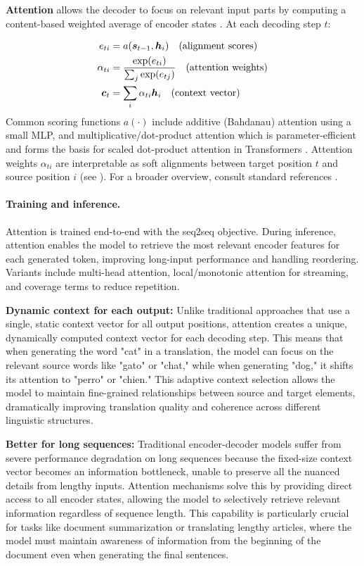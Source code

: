 \textbf{Attention} allows the decoder to focus on relevant input parts by computing a content-based weighted average of encoder states \cite{Bahdanau2014}. At each decoding step $t$:

\begin{align}
e_{ti} &= a(\boldsymbol{s}_{t-1}, \boldsymbol{h}_i) \quad \text{(alignment scores)} \\
\alpha_{ti} &= \frac{\exp(e_{ti})}{\sum_j \exp(e_{tj})} \quad \text{(attention weights)} \\
\boldsymbol{c}_t &= \sum_i \alpha_{ti} \boldsymbol{h}_i \quad \text{(context vector)}
\end{align}
Common scoring functions $a(\cdot)$ include additive (Bahdanau) attention using a small MLP, and multiplicative/dot-product attention which is parameter-efficient and forms the basis for scaled dot-product attention in Transformers \cite{Vaswani2017}. Attention weights $\alpha_{ti}$ are interpretable as soft alignments between target position $t$ and source position $i$ (see \cite{WebAttentionWikipedia}). For a broader overview, consult standard references \cite{WebDLBRNN,D2LChapterAttention}.

\paragraph{Training and inference.} Attention is trained end-to-end with the seq2seq objective. During inference, attention enables the model to retrieve the most relevant encoder features for each generated token, improving long-input performance and handling reordering. Variants include multi-head attention, local/monotonic attention for streaming, and coverage terms to reduce repetition.


\textbf{Dynamic context for each output:} Unlike traditional approaches that use a single, static context vector for all output positions, attention creates a unique, dynamically computed context vector for each decoding step. This means that when generating the word "cat" in a translation, the model can focus on the relevant source words like "gato" or "chat," while when generating "dog," it shifts its attention to "perro" or "chien." This adaptive context selection allows the model to maintain fine-grained relationships between source and target elements, dramatically improving translation quality and coherence across different linguistic structures.

\textbf{Better for long sequences:} Traditional encoder-decoder models suffer from severe performance degradation on long sequences because the fixed-size context vector becomes an information bottleneck, unable to preserve all the nuanced details from lengthy inputs. Attention mechanisms solve this by providing direct access to all encoder states, allowing the model to selectively retrieve relevant information regardless of sequence length. This capability is particularly crucial for tasks like document summarization or translating lengthy articles, where the model must maintain awareness of information from the beginning of the document even when generating the final sentences.

